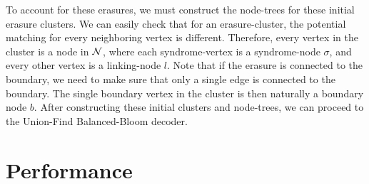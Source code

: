 To account for these erasures, we must construct the node-trees for these initial erasure clusters. We can easily check that for an erasure-cluster, the potential matching for every neighboring vertex is different. Therefore, every vertex in the cluster is a node in $\mathcal{N}$, where each syndrome-vertex is a syndrome-node $\sigma$, and every other vertex is a linking-node $l$. Note that if the erasure is connected to the boundary, we need to make sure that only a single edge is connected to the boundary. The single boundary vertex in the cluster is then naturally a boundary node $b$. After constructing these initial clusters and node-trees, we can proceed to the Union-Find Balanced-Bloom decoder.  

\section{Performance}

